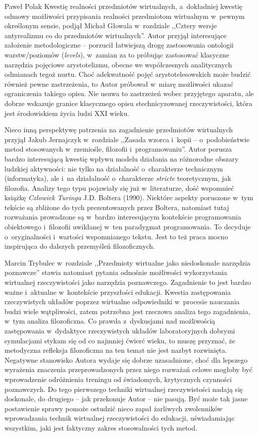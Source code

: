 \begin{recplenv}{Paweł Polak}
Kwestię realności przedmiotów wirtualnych, a~dokładniej kwestię odmowy możliwości przypisania realności przedmiotom wirtualnym w~pewnym określonym sensie, podjął Michał Głowala w~rozdziale ,,Cztery wersje antyrealizmu co do przedmiotów wirtualnych''. Autor przyjął interesujące założenie metodologiczne -- porzucił łatwiejszą drogę zastosowania ontologii warstw/poziomów (\textit{levels}), w~zamian za to próbując zastosować klasyczne narzędzia pojęciowe arystotelizmu, obecne we współczesnych analitycznych odmianach tegoż nurtu. Choć adekwatność pojęć arystotelesowskich może budzić również pewne zastrzeżenia, to Autor próbował w~miarę możliwości ukazać ograniczenia takiego opisu. Nie usuwa to zastrzeżeń wobec przyjętego aparatu, ale dobrze wskazuje granice klasycznego opisu stechnicyzowanej rzeczywistości, która jest środowiskiem życia ludzi XXI wieku.

Nieco inną perspektywę patrzenia na zagadnienie przedmiotów wirtualnych przyjął Jakub Jernajczyk w~rozdziale ,,Zasada wzorca i~kopii -- o~podobieństwie metod stosowanych w~rzemiośle, filozofii i~programowaniu''. Autor porusza bardzo interesującą kwestię wpływu modelu działania na różnorodne obszary ludzkiej aktywności: nie tylko na działalność o~charakterze technicznym (informatyka), ale i~na działalność o~charakterze \textit{stricte} teoretycznym, jak filozofia. Analizy tego typu pojawiały się już w~literaturze, dość wspomnieć książkę \textit{Człowiek Turinga} J.D. Boltera (1990). Niektóre aspekty poruszone w~tym tekście są zbliżone do tych prezentowanych przez Boltera, natomiast tutaj rozważania prowadzone są w~bardzo interesującym kontekście programowania obiektowego i~filozofii uwikłanej w~ten paradygmat programowania. To decyduje o~oryginalności i~wartości wspomnianego tekstu. Jest to też praca mocno inspirująca do dalszych przemyśleń filozoficznych.

Marcin Trybulec w~rozdziale ,,Przedmioty wirtualne jako niedoskonałe narzędzia poznawcze'' stawia natomiast pytania odnośnie możliwości wykorzystania wirtualnej rzeczywistości jako narzędzia poznawczego. Zagadnienie to jest bardzo ważne i~aktualne w~kontekście przyszłości edukacji. Kwestia zastępowania rzeczywistych układów poprzez wirtualne odpowiedniki w~procesie nauczania budzi wiele wątpliwości, zatem potrzebna jest rzeczowa analiza tego zagadnienia, w~tym analiza filozoficzna. Co prawda z~dyskusjami nad możliwością zastępowania w~dydaktyce rzeczywistych układów laboratoryjnych dobrymi symulacjami stykam się od co najmniej ćwierć wieku, to muszę przyznać, że metodyczna refleksja filozoficzna na ten temat nie jest nazbyt rozwinięta. Negatywne stanowisko Autora wydaje się dobrze uzasadnione, choć dla lepszego wyrażenia znaczenia przeprowadzonych przez niego rozważań celowe mogłoby być wprowadzenie odróżnienia treningu od świadomych, krytycznych czynności poznawczych. Do tego pierwszego techniki wirtualnej rzeczywistości nadają się doskonale, do drugiego -- jak przekonuje Autor -- nie pasują. Być może tak jasne postawienie sprawy pomoże ostudzić nieco zapał żarliwych zwolenników wprowadzania technik wirtualnej rzeczywistości do edukacji, uświadamiając wszystkim, jaki jest faktyczny zakres stosowalności tych metod.


\end{recplenv}
